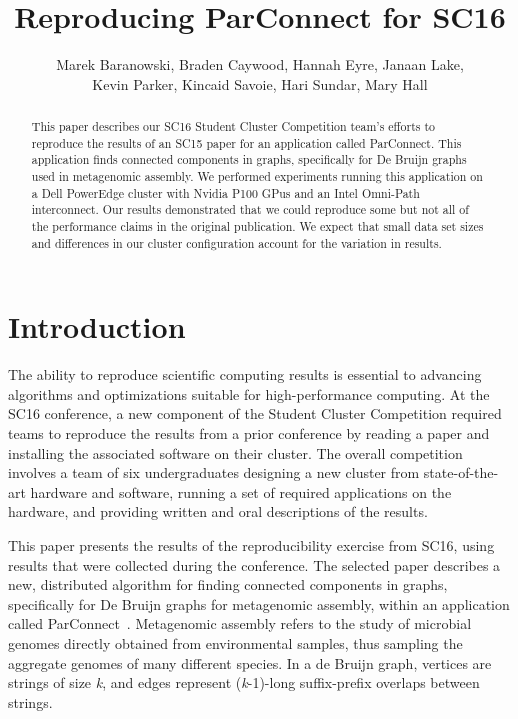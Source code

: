 \documentclass[11pt]{amsart}
\title{Reproducing ParConnect for SC16}
\author{Marek Baranowski, Braden Caywood, Hannah Eyre, Janaan Lake, \\Kevin Parker, Kincaid Savoie, Hari Sundar, Mary Hall}
\begin{document}
\maketitle
\begin{abstract}
This paper describes our SC16 Student Cluster Competition team's efforts to reproduce the results of
an SC15 paper for an application called ParConnect.  This application finds connected components in graphs, specifically for De Bruijn graphs used in metagenomic assembly. We performed experiments running this application on a Dell PowerEdge cluster with Nvidia P100 GPus and an Intel Omni-Path interconnect. Our results demonstrated that we could reproduce some but not all of the performance claims in the
original publication.  We expect that small data set sizes and differences in our cluster configuration account for the variation
in results.
\end{abstract}

\section{Introduction}
The ability to reproduce scientific computing results is essential to advancing algorithms and optimizations suitable for high-performance
computing.  At the SC16 conference, a new component of the Student Cluster Competition required teams to reproduce the results from 
a prior conference by reading a paper and installing the associated software on their cluster.  The overall competition involves a team of 
six undergraduates designing a new cluster from state-of-the-art hardware and software, running a set of required applications
on the hardware, and providing written and oral descriptions of the results.

This paper presents the results of the reproducibility exercise from SC16, using results that were collected during the conference.  The 
selected paper describes a new, distributed algorithm for finding connected components in graphs, specifically for De Bruijn graphs for
metagenomic assembly, within an application called ParConnect~\cite{Flick:2015}. Metagenomic assembly refers to the study of microbial
genomes directly obtained from environmental samples, thus sampling the aggregate genomes of many different species.  In a de Bruijn 
graph, vertices are strings of size \textit{k}, and edges represent (\textit{k}-1)-long suffix-prefix overlaps between strings.
\end{document}
